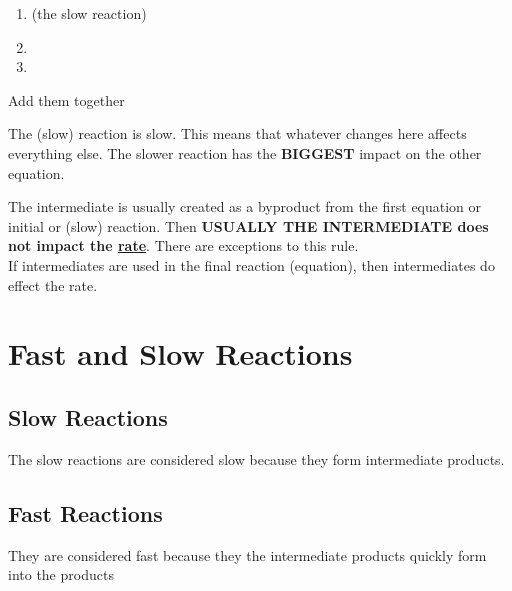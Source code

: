 \documentclass{article}
\begin{document}
\begin{enumerate}
\item {} (the slow reaction)
\item {} 
\item {}
\end{enumerate}
Add them together\\

The (slow) reaction is slow. This means that whatever changes here affects everything else. The slower reaction has the \textbf{BIGGEST} impact on the other equation. 

The intermediate is usually created as a byproduct from the first equation or initial or (slow) reaction. Then \textbf{USUALLY THE INTERMEDIATE does not impact the \underline{rate}}. There are exceptions to this rule.\\
If intermediates are used in the final reaction (equation), then intermediates do effect the rate.


\section{Fast and Slow Reactions}
\subsection{Slow Reactions}
The slow reactions are considered slow because they form intermediate products. 
\subsection{Fast Reactions}
They are considered fast because they the intermediate products quickly form into the products
\end{document}
